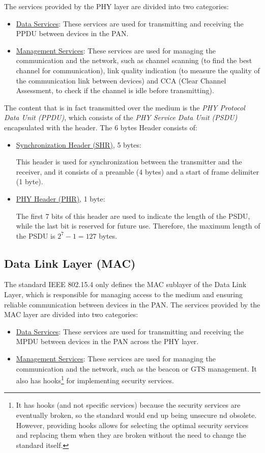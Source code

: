 The services provided by the PHY layer are divided into two categories:
\begin{itemize}
    \item \ul{Data Services}: These services are used for transmitting and receiving the PPDU between devices in the PAN.
    \item \ul{Management Services}: These services are used for managing the communication and the network, such as channel scanning (to find the best channel for communication), link quality indication (to measure the quality of the communication link between devices) and CCA (Clear Channel Assessment, to check if the channel is idle before transmitting).
\end{itemize}

The content that is in fact transmitted over the medium is the \emph{PHY Protocol Data Unit (PPDU)}, which consists of the \emph{PHY Service Data Unit (PSDU)} encapsulated with the header. The $6$ bytes Header consists of:
\begin{itemize}
    \item \ul{Synchronization Header (SHR)}, 5 bytes:
    
    This header is used for synchronization between the transmitter and the receiver, and it consists of a preamble (4 bytes) and a start of frame delimiter (1 byte).

    \item \ul{PHY Header (PHR)}, 1 byte:
    
    The first 7 bits of this header are used to indicate the length of the PSDU, while the last bit is reserved for future use. Therefore, the maximum length of the PSDU is $2^7 - 1 = 127$ bytes.
\end{itemize}

\subsection{Data Link Layer (MAC)}

The standard IEEE 802.15.4 only defines the MAC sublayer of the Data Link Layer, which is responsible for managing access to the medium and ensuring reliable communication between devices in the PAN. The services provided by the MAC layer are divided into two categories:
\begin{itemize}
    \item \ul{Data Services}: These services are used for transmitting and receiving the MPDU between devices in the PAN across the PHY layer.
    \item \ul{Management Services}: These services are used for managing the communication and the network, such as the beacon or GTS management. It also has hooks\footnote{It has hooks (and not specific services) because the security services are eventually broken, so the standard would end up being unsecure nd obsolete. However, providing hooks allows for selecting the optimal security services and replacing them when they are broken without the need to change the standard itself.} for implementing security services.
\end{itemize}


